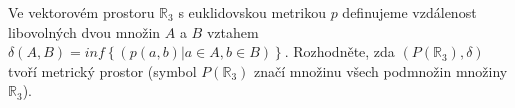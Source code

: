 \subsubsection{}
Ve vektorovém prostoru $\mathbb{R}_{3}$ s euklidovskou metrikou $p$ definujeme
vzdálenost libovolných dvou množin $A$ a $B$ vztahem $\delta(A,B) = inf \left \{  (p(a,b)|a \in A, b \in B )\right \}$. Rozhodněte, zda $(P(\mathbb{R}_{3}), \delta)$
tvoří metrický prostor (symbol $P(\mathbb{R}_{3})$ značí množinu všech podmnožin
množiny $\mathbb{R}_{3}$).
